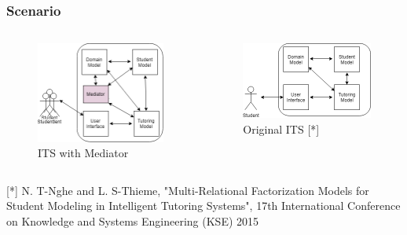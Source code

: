 \documentclass{beamer}
\begin{document}
\begin{frame}
\frametitle{Scenario}
\begin{columns}[onlytextwidth]
	\begin{column}{.45\textwidth}
		\begin{figure}
			\includegraphics[width=.8\textwidth]{pp1}

				\caption{ITS with Mediator}
		\end{figure}
	\end{column}
	\hfill
	\begin{column}{.45\textwidth}
		\begin{figure}
			\includegraphics[width=.8\textwidth]{pp2}
					\caption{Original ITS [*]}

					
		\end{figure}
	
	\end{column}

\end{columns}
\begin{flushright}
	
\end{flushright}
{\tiny 					[*] N. T-Nghe and L. S-Thieme, "Multi-Relational Factorization Models for Student Modeling in Intelligent Tutoring Systems",  17th International Conference on Knowledge and Systems Engineering (KSE) 2015
}
\end{frame}
\end{document}
